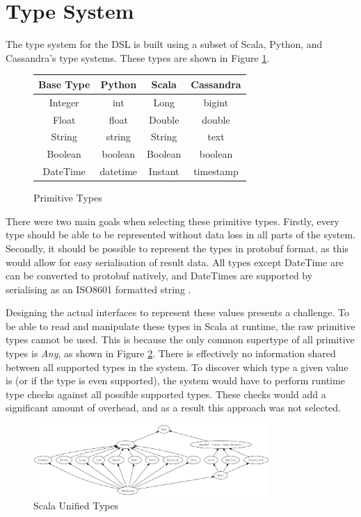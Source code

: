 \section{Type System}
The type system for the DSL is built using a subset of Scala, Python, and Cassandra's type systems. These types are shown in Figure \ref{fig:datatypes}.

\begin{figure}[h]
	\centering
	\begin{tabular}{| c | c | c | c |}
		\hline
		\textbf{Base Type} & \textbf{Python} & \textbf{Scala} & \textbf{Cassandra} \\ \hline
		Integer & int & Long & bigint \\ \hline
		Float & float & Double & double \\ \hline
		String & string & String & text \\ \hline
		Boolean & boolean & Boolean & boolean \\ \hline
		DateTime & datetime & Instant & timestamp \\ \hline
	\end{tabular}
	\caption{Primitive Types}
	\label{fig:datatypes}
\end{figure}

There were two main goals when selecting these primitive types. Firstly, every type should be able to be represented without data loss in all parts of the system. Secondly, it should be possible to represent the types in protobuf format, as this would allow for easy serialisation of result data. All types except DateTime are can be converted to protobuf natively, and DateTimes are supported by serialising as an ISO8601 formatted string \cite{iso_8601}.

Designing the actual interfaces to represent these values presents a challenge. To be able to read and manipulate these types in Scala at runtime, the raw primitive types cannot be used. This is because the only common supertype of all primitive types is \textit{Any}, as shown in Figure \ref{fig:scala-unified-types}. There is effectively no information shared between all supported types in the system. To discover which type a given value is (or if the type is even supported), the system would have to perform runtime type checks against all possible supported types. These checks would add a significant amount of overhead, and as a result this approach was not selected.

\begin{figure}[h]
	\centering
	\includegraphics[width=0.8\textwidth]{chapters/diagrams/implementation/unified-types-diagram}
	\caption{Scala Unified Types \protect\cite{scala_unified_types}}
	\label{fig:scala-unified-types}
\end{figure}

